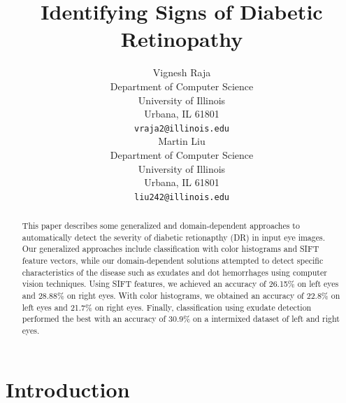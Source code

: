 \documentclass{article} %
\title{Identifying Signs of Diabetic Retinopathy}
\author{
Vignesh Raja\\
Department of Computer Science\\
University of Illinois\\
Urbana, IL 61801 \\
\texttt{vraja2@illinois.edu} \\
\And
Martin Liu \\
Department of Computer Science \\
University of Illinois\\
Urbana, IL 61801 \\
\texttt{liu242@illinois.edu} \\
}
\begin{document}
\maketitle

\begin{abstract}
This paper describes some generalized and domain-dependent approaches to automatically detect the severity of diabetic retionapthy (DR) in input eye images. Our generalized approaches include classification with color histograms and SIFT feature vectors, while our domain-dependent solutions attempted to detect specific characteristics of the disease such as exudates and dot hemorrhages using computer vision techniques. Using SIFT features, we achieved an accuracy of 26.15\% on left eyes and 28.88\% on right eyes. With color histograms, we obtained an accuracy of 22.8\% on left eyes and 21.7\% on right eyes. Finally, classification using exudate detection performed the best with an accuracy of 30.9\% on a intermixed dataset of left and right eyes.
\end{abstract}

\section{Introduction}
\end{document}
